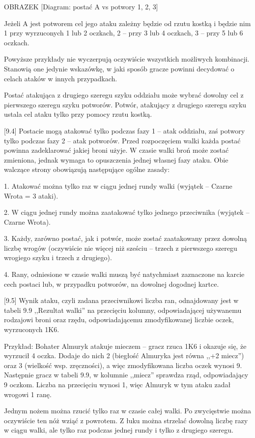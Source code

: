 OBRAZEK
[Diagram: postać A vs potwory 1, 2, 3]

Jeżeli A jest potworem cel jego ataku zależny będzie od rzutu kostką i będzie nim 1 przy wyrzuconych 1 lub 2 oczkach, 2 – przy 3 lub 4 oczkach, 3 – przy 5 lub 6 oczkach.

Powyższe przykłady nie wyczerpują oczywiście wszystkich możliwych kombinacji.
Stanowią one jedynie wskazówkę, w jaki sposób gracze powinni decydować o celach ataków w innych przypadkach.

Postać atakująca z drugiego szeregu szyku oddziału może wybrać dowolny cel z pierwszego szeregu szyku potworów.
Potwór, atakujący z drugiego szeregu szyku ustala cel ataku tylko przy pomocy rzutu kostką.

[9.4] Postacie mogą atakować tylko podczas fazy 1 – atak oddziału, zaś potwory tylko podczas fazy 2 – atak potworów.
Przed rozpoczęciem walki każda postać powinna zadeklarować jakiej broni użyje.
W czasie walki broń może zostać zmieniona, jednak wymaga to opuszczenia jednej własnej fazy ataku.
Obie walczące strony obowiązują następujące ogólne zasady:

1.
Atakować można tylko raz w ciągu jednej rundy walki (wyjątek – Czarne Wrota = 3 ataki).

2.
W ciągu jednej rundy można zaatakować tylko jednego przeciwnika (wyjątek – Czarne Wrota).

3.
Każdy, zarówno postać, jak i potwór, może zostać zaatakowany przez dowolną liczbę wrogów (oczywiście nie więcej niż sześciu – trzech z pierwszego szeregu wrogiego szyku i trzech z drugiego).

4.
Rany, odniesione w czasie walki muszą być natychmiast zaznaczone na karcie cech postaci lub, w przypadku potworów, na dowolnej dogodnej kartce.

[9.5] Wynik ataku, czyli zadana przeciwnikowi liczba ran, odnajdowany jest w tabeli 9.9 ,,Rezultat walki'' na przecięciu kolumny, odpowiadającej używanemu rodzajowi broni oraz rzędu, odpowiadającemu zmodyfikowanej liczbie oczek, wyrzuconych 1K6.

Przykład: Bohater Almuryk atakuje mieczem – gracz rzuca 1K6 i okazuje się, że wyrzucił 4 oczka.
Dodaje do nich 2 (biegłość Almuryka jest równa ,,+2 miecz'') oraz 3 (wielkość wsp. zręczności), a więc zmodyfikowana liczba oczek wynosi 9.
Następnie gracz w tabeli 9.9, w kolumnie ,,miecz'' sprawdza rząd, odpowiadający 9 oczkom.
Liczba na przecięciu wynosi 1, więc Almuryk w tym ataku zadał wrogowi 1 ranę.

Jednym nożem można rzucić tylko raz w czasie całej walki.
Po zwycięstwie można oczywiście ten nóż wziąć z powrotem.
Z łuku można strzelać dowolną liczbę razy w ciągu walki, ale tylko raz podczas jednej rundy i tylko z drugiego szeregu.

